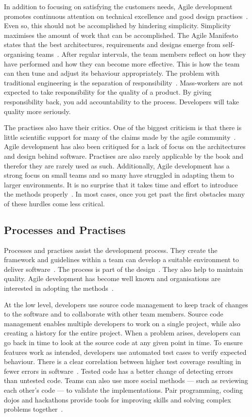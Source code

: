 \documentclass[english]{tktltiki2}
\begin{document}
In addition to focusing on satisfying the customers needs, Agile development promotes continuous attention on technical excellence and good design practises~\cite{BBB01b}. Even so, this should not be accomplished by hindering simplicity. Simplicity maximises the amount of work that can be accomplished. The Agile Manifesto states that the best architectures, requirements and designs emerge from self-organising teams~\cite{BBB01b}. After regular intervals, the team members reflect on how they have performed and how they can become more effective. This is how the team can then tune and adjust its behaviour appropriately. The problem with traditional engineering is the separation of responsibility~\cite{Pop02}. Mass-workers are not expected to take responsibility for the quality of a product. By giving responsibility back, you add accountability to the process. Developers will take quality more seriously.

The practises also have their critics. One of the biggest criticism is that there is little scientific support for many of the claims made by the agile community~\cite{DD08}. Agile development has also been critiqued for a lack of focus on the architectures and design behind software. Practises are also rarely applicable by the book and therefor they are rarely used as such. Additionally, Agile development has a strong focus on small teams and so many have struggled in adapting them to larger environments. It is no surprise that it takes time and effort to introduce the methods properly~\cite{DD08}. In most cases, once you get past the first obstacles many of these hurdles come less critical.

\subsection{Processes and Practises}

Processes and practises assist the development process. They create the framework and guidelines within a team can develop a suitable environment to deliver software~\cite{Kni07}. The process is part of the design~\cite{Fow05}. They also help to maintain quality. Agile development has become well known and organisations are interested in adopting the methods~\cite{DD08}.

At the low level, developers use source code management to keep track of changes to the software and to collaborate with other team members. Source code management enables multiple developers to work on a single project, while also creating a history for the entire project. When a problem arises, developers can go back in time to look at the source code at any given point in time. To ensure features work as intended, developers use automated test cases to verify expected behaviour. There is a clear correlation between higher test coverage resulting in fewer errors in software~\cite{MND09}. Tested code has a better change of detecting errors than untested code. Teams can also use more social methods — such as reviewing each other’s code — to validate the implementations. Pair programming, coding dojos and hackathons provide tools for improving skills and solving complex problems together~\cite{DD08, HHL13}.
\end{document}
